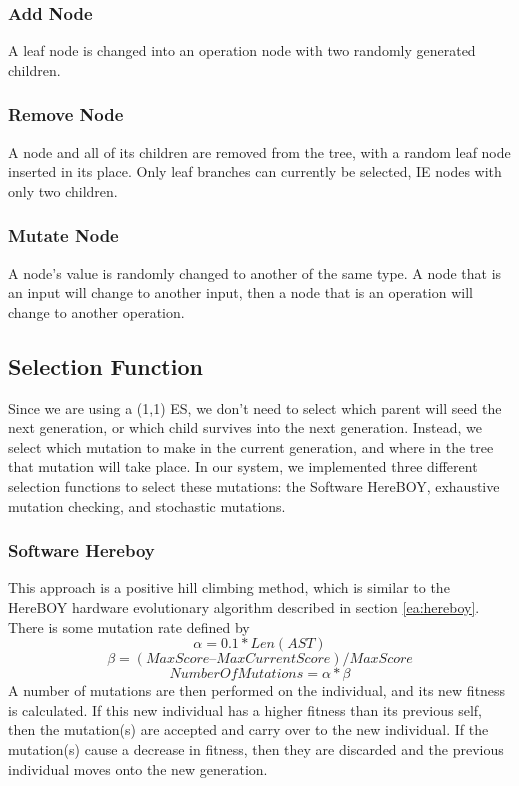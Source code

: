 \documentclass[conference]{IEEEtran}
\begin{document}
{\subsubsection{Add Node}
A leaf node is changed into an operation node with two randomly generated children. 
\subsubsection{Remove Node}
A node and all of its children are removed from the tree, with a random leaf node inserted in its place. 
Only leaf branches can currently be selected, IE nodes with only two children. 
\subsubsection{Mutate Node}
A node's value is randomly changed to another of the same type. A node that is an input will change to another input, then a node that is an operation will change to another operation. 

\subsection{Selection Function}
\label{net:selection}
\par Since we are using a (1,1) ES, we don't need to select which parent will seed the next generation, or which child survives into the next generation.
Instead, we select which mutation to make in the current generation, and where in the tree that mutation will take place.
In our system, we implemented three different selection functions to select these mutations: the Software HereBOY, exhaustive mutation checking, and stochastic mutations.
\subsubsection{Software Hereboy}
\par This approach is a positive hill climbing method, which is similar to the HereBOY hardware evolutionary algorithm described in section \ref{ea:hereboy}.
There is some mutation rate defined by
\begin{equation}
    \alpha = 0.1*Len(AST)
\end{equation}
\begin{equation}
    \beta = (MaxScore – MaxCurrentScore)/MaxScore
\end{equation}
\begin{equation}
    Number Of Mutations = \alpha * \beta
\end{equation}
A number of mutations are then performed on the individual, and its new fitness is calculated.
If this new individual has a higher fitness than its previous self, then the mutation(s) are accepted and carry over to the new individual.
If the mutation(s) cause a decrease in fitness, then they are discarded and the previous individual moves onto the new generation.
}
\end{document}
